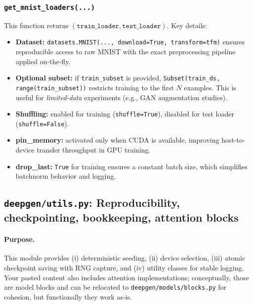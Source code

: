 \subsubsection*{\texttt{get\_mnist\_loaders(...)}}
This function returns \((\texttt{train\_loader}, \texttt{test\_loader})\). Key details:
\begin{itemize}
  \item \textbf{Dataset:} \texttt{datasets.MNIST(..., download=True, transform=tfm)} ensures reproducible access to raw MNIST with the exact preprocessing pipeline applied on-the-fly.
  \item \textbf{Optional subset:} if \texttt{train\_subset} is provided, \texttt{Subset(train\_ds, range(train\_subset))} restricts training to the first \(N\) examples. This is useful for \emph{limited-data} experiments (e.g., GAN augmentation studies).
  \item \textbf{Shuffling:} enabled for training (\texttt{shuffle=True}), disabled for test loader (\texttt{shuffle=False}).
  \item \textbf{pin\_memory:} activated only when CUDA is available, improving host-to-device transfer throughput in GPU training.
  \item \textbf{drop\_last:} \texttt{True} for training ensures a constant batch size, which simplifies batchnorm behavior and logging.
\end{itemize}

\subsection{\texttt{deepgen/utils.py}: Reproducibility, checkpointing, bookkeeping, attention blocks}
\label{subsec:code_utils}

\paragraph{Purpose.}
This module provides (i) deterministic seeding, (ii) device selection, (iii) atomic checkpoint saving with RNG capture, and (iv) utility classes for stable logging. Your pasted content also includes attention implementations; conceptually, those are model blocks and can be relocated to \texttt{deepgen/models/blocks.py} for cohesion, but functionally they work as-is.

